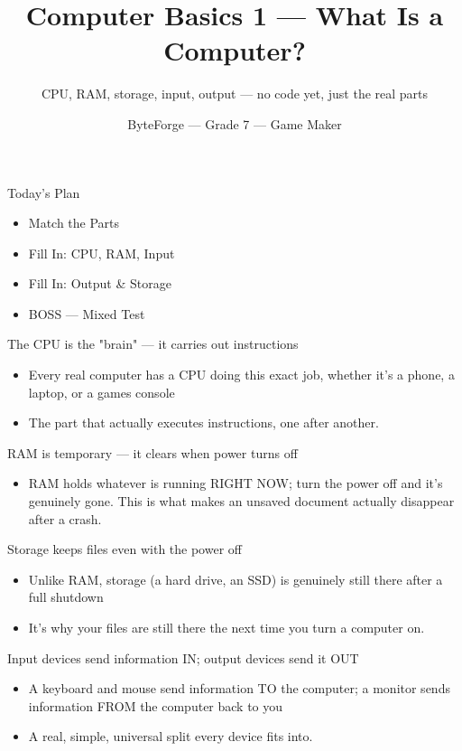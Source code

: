 \documentclass[aspectratio=169]{beamer}
\title{Computer Basics 1 — What Is a Computer?}
\subtitle{CPU, RAM, storage, input, output — no code yet, just the real parts}
\author{ByteForge --- Grade 7 --- Game Maker}
\date{}
\begin{document}
\begin{frame}
    \titlepage
\end{frame}

\begin{frame}{Today's Plan}
    \begin{itemize}
        \item Match the Parts
        \item Fill In: CPU, RAM, Input
        \item Fill In: Output \& Storage
        \item[$\bigstar$] BOSS --- Mixed Test
    \end{itemize}
\end{frame}

\begin{frame}{The CPU is the "brain" — it carries out instructions}
    \large
    \begin{itemize}
        \item Every real computer has a CPU doing this exact job, whether it's a phone, a laptop, or a games console
        \item The part that actually executes instructions, one after another.
    \end{itemize}
\end{frame}


\begin{frame}{RAM is temporary — it clears when power turns off}
    \large
    \begin{itemize}
        \item RAM holds whatever is running RIGHT NOW; turn the power off and it's genuinely gone. This is what makes an unsaved document actually disappear after a crash.
    \end{itemize}
\end{frame}


\begin{frame}{Storage keeps files even with the power off}
    \large
    \begin{itemize}
        \item Unlike RAM, storage (a hard drive, an SSD) is genuinely still there after a full shutdown
        \item It's why your files are still there the next time you turn a computer on.
    \end{itemize}
\end{frame}


\begin{frame}{Input devices send information IN; output devices send it OUT}
    \large
    \begin{itemize}
        \item A keyboard and mouse send information TO the computer; a monitor sends information FROM the computer back to you
        \item A real, simple, universal split every device fits into.
    \end{itemize}
\end{frame}
\end{document}
